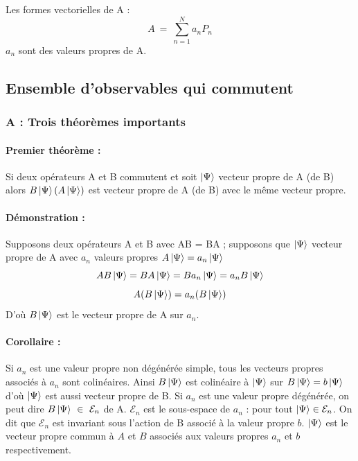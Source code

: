 \documentclass[12pt,a4paper,titlepage]{book}
\begin{document}
Les formes vectorielles de A :
\begin{equation*}
A ~=~ \sum\limits_{n=1}^{N} a_n P_n
\end{equation*}
$a_n$ sont des valeurs propres de A.\\

\subsection{Ensemble d'observables qui commutent}
\subsubsection{A : Trois théorèmes importants}

\paragraph*{Premier théorème :}

Si deux opérateurs A et B commutent et soit $\ket{\Psi}$ vecteur propre de A (de B) alors $B \ket \Psi (A \ket \Psi)$ est vecteur propre de A (de B) avec le même vecteur propre.

\paragraph*{Démonstration :}

Supposons deux opérateurs A et B avec AB = BA ; supposons que $\ket \Psi$ vecteur propre de A avec $a_n$ valeurs propres $A \ket \Psi = a_n \ket \Psi$
\begin{equation*}
AB \ket \Psi = BA \ket \Psi = B a_n \ket \Psi = a_n B \ket \Psi
\end{equation*}
\begin{equation*}
A(B \ket \Psi) = a_n (B \ket \Psi )
\end{equation*}
D'où $B \ket \Psi$ est le vecteur propre de A sur $a_n$.

\paragraph*{Corollaire :}

Si $a_n$ est une valeur propre non dégénérée simple, tous les vecteurs propres associés à $a_n$ sont colinéaires. Ainsi $B \ket \Psi$ est colinéaire à $\ket \Psi$ sur $B \ket \Psi = b \ket \Psi$ d'où $\ket \Psi$ est aussi vecteur propre de B. Si $a_n$ est une valeur propre dégénérée, on peut dire $B \ket \Psi ~\in~ \mathcal{E}_n$ de A. $\mathcal{E}_n$ est le sous-espace de $a_n$ : pour tout $\ket \Psi \in \mathcal{E}_n$. On dit que $\mathcal{E}_n$ est invariant sous l'action de B associé à la valeur propre $b$. $\ket{\Psi}$ est le vecteur propre commun à $A$ et $B$ associés aux valeurs propres $a_n$ et $b$ respectivement.
\end{document}
